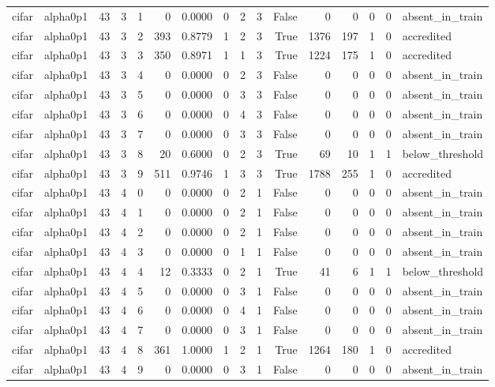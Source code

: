 \begin{tabular}{llrrrrrrrrrrrrrl}
cifar & alpha0p1 & 43 & 3 & 1 & 0 & 0.0000 & 0 & 2 & 3 & False & 0 & 0 & 0 & 0 & absent\_in\_train \\
cifar & alpha0p1 & 43 & 3 & 2 & 393 & 0.8779 & 1 & 2 & 3 & True & 1376 & 197 & 1 & 0 & accredited \\
cifar & alpha0p1 & 43 & 3 & 3 & 350 & 0.8971 & 1 & 1 & 3 & True & 1224 & 175 & 1 & 0 & accredited \\
cifar & alpha0p1 & 43 & 3 & 4 & 0 & 0.0000 & 0 & 2 & 3 & False & 0 & 0 & 0 & 0 & absent\_in\_train \\
cifar & alpha0p1 & 43 & 3 & 5 & 0 & 0.0000 & 0 & 3 & 3 & False & 0 & 0 & 0 & 0 & absent\_in\_train \\
cifar & alpha0p1 & 43 & 3 & 6 & 0 & 0.0000 & 0 & 4 & 3 & False & 0 & 0 & 0 & 0 & absent\_in\_train \\
cifar & alpha0p1 & 43 & 3 & 7 & 0 & 0.0000 & 0 & 3 & 3 & False & 0 & 0 & 0 & 0 & absent\_in\_train \\
cifar & alpha0p1 & 43 & 3 & 8 & 20 & 0.6000 & 0 & 2 & 3 & True & 69 & 10 & 1 & 1 & below\_threshold \\
cifar & alpha0p1 & 43 & 3 & 9 & 511 & 0.9746 & 1 & 3 & 3 & True & 1788 & 255 & 1 & 0 & accredited \\
cifar & alpha0p1 & 43 & 4 & 0 & 0 & 0.0000 & 0 & 2 & 1 & False & 0 & 0 & 0 & 0 & absent\_in\_train \\
cifar & alpha0p1 & 43 & 4 & 1 & 0 & 0.0000 & 0 & 2 & 1 & False & 0 & 0 & 0 & 0 & absent\_in\_train \\
cifar & alpha0p1 & 43 & 4 & 2 & 0 & 0.0000 & 0 & 2 & 1 & False & 0 & 0 & 0 & 0 & absent\_in\_train \\
cifar & alpha0p1 & 43 & 4 & 3 & 0 & 0.0000 & 0 & 1 & 1 & False & 0 & 0 & 0 & 0 & absent\_in\_train \\
cifar & alpha0p1 & 43 & 4 & 4 & 12 & 0.3333 & 0 & 2 & 1 & True & 41 & 6 & 1 & 1 & below\_threshold \\
cifar & alpha0p1 & 43 & 4 & 5 & 0 & 0.0000 & 0 & 3 & 1 & False & 0 & 0 & 0 & 0 & absent\_in\_train \\
cifar & alpha0p1 & 43 & 4 & 6 & 0 & 0.0000 & 0 & 4 & 1 & False & 0 & 0 & 0 & 0 & absent\_in\_train \\
cifar & alpha0p1 & 43 & 4 & 7 & 0 & 0.0000 & 0 & 3 & 1 & False & 0 & 0 & 0 & 0 & absent\_in\_train \\
cifar & alpha0p1 & 43 & 4 & 8 & 361 & 1.0000 & 1 & 2 & 1 & True & 1264 & 180 & 1 & 0 & accredited \\
cifar & alpha0p1 & 43 & 4 & 9 & 0 & 0.0000 & 0 & 3 & 1 & False & 0 & 0 & 0 & 0 & absent\_in\_train \\

\end{tabular}
